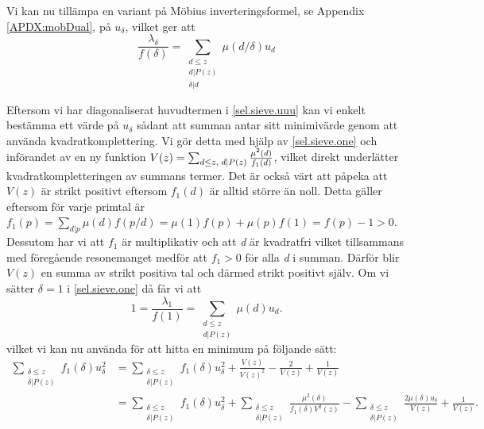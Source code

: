 Vi kan nu tillämpa en variant på Möbius inverteringsformel, se Appendix \ref{APDX:mobDual}, på \(u_\delta\), vilket ger att
\begin{equation}
    \frac{\lambda_\delta}{f(\delta)} = \sum_{\substack{d\leq z\\d|P(z)\\\delta|d}} \mu(d/\delta)u_d \label{sel.sieve.one}
\end{equation}

Eftersom vi har diagonaliserat huvudtermen i \eqref{sel.sieve.uuu} kan vi enkelt bestämma ett värde på \(u_\delta\) sådant att summan antar sitt minimivärde genom att använda kvadratkomplettering. 
Vi gör detta med hjälp av \eqref{sel.sieve.one} och införandet av en ny funktion \(V(z) = \sum_{d\leq z,\; d\mid P(z)}\frac{\mu^2(d)}{f_1(d)}\), vilket direkt underlätter kvadratkompletteringen av summans termer. 
Det är också värt att påpeka att \(V(z)\) är strikt positivt eftersom \(f_1(d)\) är alltid större än noll. 
Detta gäller eftersom för varje primtal är \(f_1(p) = \sum_{d|p}\mu(d)f({p}/{d}) = \mu(1)f(p) + \mu(p)f(1) = f(p) - 1 > 0\).
Dessutom har vi att \(f_1\) är multiplikativ och att \textit{d} är kvadratfri vilket tillsammans med föregående resonemanget medför att \(f_1 > 0\) för alla \textit{d} i summan. 
Därför blir \(V(z)\) en summa av strikt positiva tal och därmed strikt positivt själv.
Om vi sätter \(\delta = 1\) i \eqref{sel.sieve.one} då får vi att
\begin{equation}
    1 = \frac{\lambda_1}{f(1)} = \sum_{\substack{d\leq z\\ d|P(z)}}\mu(d)u_d.\nonumber
\end{equation}
vilket vi kan nu använda för att hitta en minimum på följande sätt:
\begin{align}
    \sum_{\substack{\delta \leq z\\ \delta | P(z)}}f_1(\delta) u_\delta^2 &= \sum_{\substack{\delta\leq z\\\delta|P(z)}} f_1(\delta)u_\delta^2 + \frac{V(z)}{V(z)^2} - \frac{2}{V(z)} + \frac{1}{V(z)}\nonumber\\
    &= \sum_{\substack{\delta\leq z\\\delta|P(z)}} f_1(\delta)u_\delta^2 + \sum_{\substack{\delta\leq z\\ \delta|P(z)}}\frac{\mu^2(\delta)}{f_1(\delta)V^2(z)} - \sum_{\substack{\delta\leq z\\\delta |P(z)}}\frac{2\mu(\delta)u_\delta}{V(z)} + \frac{1}{V(z)}.\label{sel.sieve.VVV}
\end{align}
